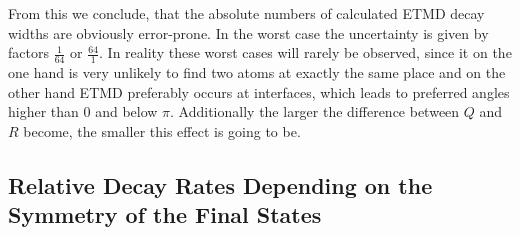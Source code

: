 From this we conclude, that the absolute numbers of calculated ETMD
decay widths are obviously error-prone. In the worst case the uncertainty
is given by factors $\frac{1}{64}$ or $\frac{64}{1}$.
In reality these worst cases will rarely be observed, since it on
the one hand is very unlikely to find two atoms at exactly the same place
and on the other hand ETMD preferably occurs at interfaces, which leads
to preferred angles higher than 0 and below $\pi$.
Additionally the larger the difference between $Q$ and $R$ become, the
smaller this effect is going to be.


\subsection{Relative Decay Rates Depending on the Symmetry of the Final States}
